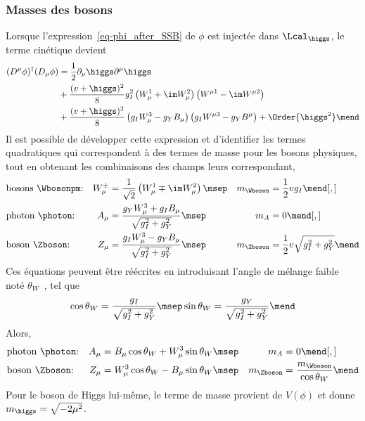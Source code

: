 \subsubsection{Masses des bosons}\label{chapter-MS-MSSM-section-formalisme-subsec-Higgs_mechanism-subsubsec-bosons}
Lorsque l'expression~\eqref{eq-phi_after_SSB} de $\phi$ est injectée dans $\Lcal_{\higgs}$, le terme cinétique devient
\begin{align}
(D^\mu\phi)^\dagger(D_\mu\phi)
&
=
\frac{1}{2}\partial_\mu \higgs \partial^\mu \higgs
\nonumber\\&
+
\frac{(v+\higgs)^2}{8} g_I^2 \left(W_\mu^1 + \im W_\mu^2\right) \left( W^{\mu1}-\im W^{\mu2}\right)
\nonumber\\&
+
\frac{(v+\higgs)^2}{8} \left(g_I W_\mu^3 - g_Y B_\mu \right) \left( g_I W^{\mu3}-g_Y B^\mu \vphantom{W^{\mu1}}\right)
+ \Order{\higgs^2}
\mend
\end{align}
Il est possible de développer cette expression et d'identifier les termes quadratiques qui correspondent à des termes de masse pour les bosons physiques, tout en obtenant les combinaisons des champs leurs correspondant,
\begin{align}
&
\text{bosons \Wbosonpm:}
&
W_\mu^\pm &= \frac{1}{\sqrt{2}} \left( W_\mu^1 \mp \im W_\mu^2 \right)
\msep&
m_{\Wboson} &= \frac{1}{2} v g_I
\mend[,]
\\
&
\text{photon \photon:}
&
A_\mu &= \frac{g_Y W_\mu^3 + g_I B_\mu}{\sqrt{g_I^2 + g_Y^2}}
\msep&
m_A &= 0
\mend[,]
\\
&
\text{boson \Zboson:}
&
Z_\mu &= \frac{g_I W_\mu^3 - g_Y B_\mu}{\sqrt{g_I^2 + g_Y^2}}
\msep&
m_{\Zboson} &= \frac{1}{2} v \sqrt{g_I^2 + g_Y^2}
\mend
\end{align}
Ces équations peuvent être réécrites en introduisant l'angle de mélange faible noté $\theta_W$~\cite{GLASHOW1961579}, tel que
\begin{equation}
\cos\theta_W = \frac{g_I}{\sqrt{g_I^2 + g_Y^2}}
\msep
\sin\theta_W = \frac{g_Y}{\sqrt{g_I^2 + g_Y^2}}
\mend
\label{eq-chapter-MS-MSSM-section-formalisme-subsec-Higgs_mechanism-thetaW}
\end{equation}
Alors,
\begin{align}
&
\text{photon \photon:}
&
A_\mu &= B_\mu \cos\theta_W + W_\mu^3 \sin\theta_W
\msep&
m_A &= 0
\mend[,]
\\
&
\text{boson \Zboson:}
&
Z_\mu &= W_\mu^3 \cos\theta_W - B_\mu \sin\theta_W
\msep&
m_{\Zboson} &= \frac{m_{\Wboson}}{\cos\theta_W}
\mend
\end{align}
Pour le boson de Higgs lui-même, le terme de masse provient de $V(\phi)$ et donne $m_{\higgs} = \sqrt{-2\mu^2}$.
